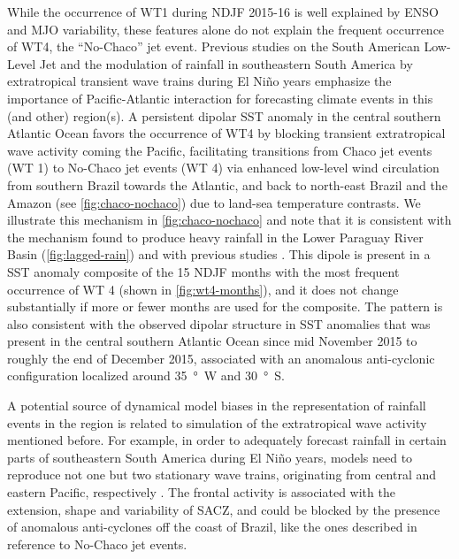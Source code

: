 \documentclass[twocol]{ametsoc}
\begin{document}
While the occurrence of WT1 during NDJF 2015-16 is well explained by ENSO and MJO variability, these features alone do not explain the frequent occurrence of WT4, the ``No-Chaco'' jet event.
Previous studies on the South American Low-Level Jet \citep[e.g.,][]{Vera:2006ib} and the modulation of rainfall in southeastern South America by extratropical transient wave trains during El Ni\~no years \citep{Barreiro:2017ct} emphasize the importance of Pacific-Atlantic interaction for forecasting climate events in this (and other) region(s).
A persistent dipolar SST anomaly in the central southern Atlantic Ocean favors the occurrence of WT4 by blocking transient extratropical wave activity coming the Pacific, facilitating transitions from Chaco jet events (WT 1) to No-Chaco jet events (WT 4) via enhanced low-level wind circulation from southern Brazil towards the Atlantic, and back to north-east Brazil and the Amazon (see \cref{fig:chaco-nochaco}) due to land-sea temperature contrasts.
We illustrate this mechanism in \cref{fig:chaco-nochaco} and note that it is consistent with the mechanism found to produce heavy rainfall in the Lower Paraguay River Basin (\cref{fig:lagged-rain}) and with previous studies \citep[e.g.,][]{Vera:2006ib,Liebmann:2004kx,Salio:2002ev}.
This dipole is present in a SST anomaly composite of the 15 NDJF months with the most frequent occurrence of WT 4 (shown in \cref{fig:wt4-months}), and it does not change substantially if more or fewer months are used for the composite.
The pattern is also consistent with the observed dipolar structure in SST anomalies that was present in the central southern Atlantic Ocean since mid November 2015 to roughly the end of December 2015, associated with an anomalous anti-cyclonic configuration localized around \SI{35}{\degree W} and \SI{30}{\degree S}.

A potential source of dynamical model biases in the representation of rainfall events in the region is related to simulation of the extratropical wave activity mentioned before.
For example, in order to adequately forecast rainfall in certain parts of southeastern South America during El Ni\~no years, models need to reproduce not one but two stationary wave trains, originating from central and eastern Pacific, respectively \citep{Barreiro:2017ct}.
The frontal activity is associated with the extension, shape and variability of SACZ, and could be blocked by the presence of anomalous anti-cyclones off the coast of Brazil, like the ones described in reference to No-Chaco jet events.
\end{document}
